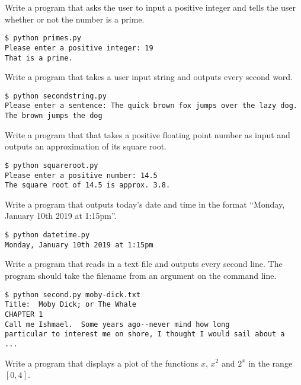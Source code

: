 \documentclass[a4paper, 12pt]{exam}
\begin{document}
\begin{questions}
    \newpage


    \question
    Write a program that asks the user to input a positive integer and tells the user whether or not the number is a prime.
    \begin{verbatim}
$ python primes.py
Please enter a positive integer: 19
That is a prime.
    \end{verbatim}
    
    \question
    Write a program that takes a user input string and outputs every second word.
    \begin{verbatim}
$ python secondstring.py
Please enter a sentence: The quick brown fox jumps over the lazy dog.
The brown jumps the dog
    \end{verbatim}

    \question
    Write a program that that takes a positive floating point number as input and outputs an approximation of its square root.
    \begin{verbatim}
$ python squareroot.py
Please enter a positive number: 14.5
The square root of 14.5 is approx. 3.8.
    \end{verbatim}

    \question
    Write a program that outputs today's date and time in the format ``Monday, January 10th 2019 at 1:15pm''.
    \begin{verbatim}
$ python datetime.py
Monday, January 10th 2019 at 1:15pm
    \end{verbatim}

    \question
    Write a program that reads in a text file and outputs every second line.
    The program should take the filename from an argument on the command line.
    \begin{verbatim}
$ python second.py moby-dick.txt
Title:  Moby Dick; or The Whale
CHAPTER 1
Call me Ishmael.  Some years ago--never mind how long
particular to interest me on shore, I thought I would sail about a
...
    \end{verbatim}

    \question
    Write a program that displays a plot of the functions $x$, $x^2$ and $2^x$ in the range $[0, 4]$.

  \end{questions}
\end{document}
